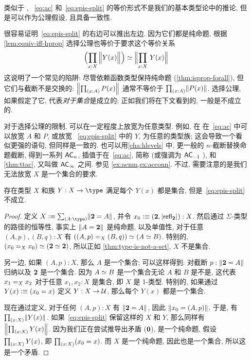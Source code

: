 类似于 \LEM{}, ~\eqref{eq:ac} 和~\eqref{eq:epis-split} 的等价形式不是我们的基本类型论中的推论, 但是可以作为公理假设, 且具备一致性.

\begin{rmk}
    很容易证明~\eqref{eq:epis-split} 的右边可以推出左边.
    因为它们都是纯命题, 根据 \cref{lem:equiv-iff-hprop} 选择公理也等价于要求这个等价关系
    \[ \eqv{\Parens{\prd{x:X} \Brck{Y(x)}}}{\Brck{\prd{x:X} Y(x)}} \]
    这说明了一个常见的陷阱: 尽管依赖函数类型保持纯命题 (\cref{thm:isprop-forall}), 但它们与截断不是交换的: $\brck{\prd{x:A} P(x)}$ 通常不等价于 $\prd{x:A} \brck{P(x)}$.
    选择公理, 如果假定了它, 代表\emph{对于集合}是成立的; 正如我们将在下文看到的, 一般是不成立的.
\end{rmk}

对于选择公理的限制, 可以在一定程度上放宽为任意类型.
例如, 在 在~\eqref{eq:ac} 中可以放宽 $A$ 和 $P$, 或放宽 ~\eqref{eq:epis-split} 中的 $Y$, 为任意的类型族;
这会导致一个看似更强的语句, 但同样是一致的.
也可以用\cref{cha:hlevels} 中, 更一般的 $n$-截断替换命题截断, 得到一系列 $\choice n$, 插值于在~\eqref{eq:ac}, 简称 \choice{} (或强调为 $\choice{-1}$ ), 和 \cref{thm:ttac}, 又叫做 $\choice\infty$ 之间.
参见 \cref{ex:acnm,ex:acconn}.
不过, 需要注意的是我们无法放宽 $X$ 是一个集合的要求.

\begin{lem}
    \label{thm:no-higher-ac}
    存在类型 $X$ 和族 $Y:X\to \type$ 满足每个 $Y(x)$ 都是集合, 但是~\eqref{eq:epis-split} 不成立.
\end{lem}
\begin{proof}
    定义 $X\defeq \sm{A:\type} \brck{\bool = A}$, 并令 $x_0 \defeq (\bool, \bproj{\refl{\bool}}) : X$.
    然后通过 $\Sigma$-类型的路径的恒等性, 事实上 $\brck{A=\bool}$ 是纯命题, 以及单值性, 对于任意 $(A,p),(B,q):X$ 有 $\eqv{(\id[X]{(A,p)}{(B,q)})}{(\eqv AB)}$.
    特别的, $\eqv{(\id[X]{x_0}{x_0})}{(\eqv \bool\bool)}$, 所以正如 \cref{thm:type-is-not-a-set}, $X$ 不是集合.

    另一边, 如果 $(A,p):X$, 那么 $A$ 是一个集合;
    可以这样得到: 对截断 $p:\brck{\bool=A}$ 归纳以及 $\bool$ 是一个集合.
    因为 $\eqv A B$ 是一个集合无论 $A$ 和 $B$ 是不是, 这代表 $\id[X]{x_1}{x_2}$ 对于任意 $x_1,x_2:X$ 是集合, 即 $X$ 是 1-类型.
    特别的, 如果通过 $Y(x) \defeq (x_0=x)$ 定义 $Y:X\to\UU$, 那么每个 $Y(x)$ 都是一个集合.

    现在通过定义, 对于任何 $(A,p):X$ 有 $\brck{\bool=A}$, 因此 $\brck{x_0 = (A,p)}$.
    于是, 有 $\prd{x:X} \brck{Y(x)}$.
    如果~\eqref{eq:epis-split} 保留这样的 $X$ 和 $Y$, 那么同样有 $\brck{\prd{x:X} Y(x)}$.
    因为我们正在尝试推导出矛盾 ($\emptyt$), 是一个纯命题, 假设 $\prd{x:X} Y(x)$, 即 $\prd{x:X} (x_0=x)$.
    而 $X$ 是一个纯命题, 因此也是一个集合, 所以这是一个矛盾.
\end{proof}

%
%
